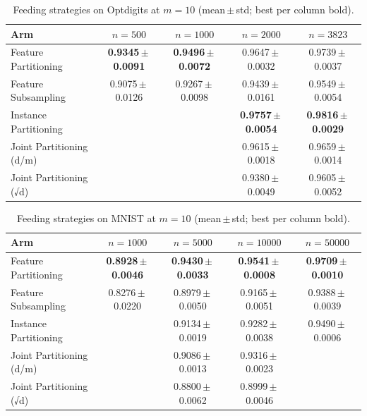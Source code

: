 \begin{table}[ht]
\centering\small
\begin{tabular}{lcccc}
\toprule
Arm & $n{=}500$ & $n{=}1000$ & $n{=}2000$ & $n{=}3823$ \\
\midrule
Feature Partitioning & \textbf{0.9345\,$\pm$\,0.0091} & \textbf{0.9496\,$\pm$\,0.0072} & 0.9647\,$\pm$\,0.0032 & 0.9739\,$\pm$\,0.0037 \\
Feature Subsampling & 0.9075\,$\pm$\,0.0126 & 0.9267\,$\pm$\,0.0098 & 0.9439\,$\pm$\,0.0161 & 0.9549\,$\pm$\,0.0054 \\
Instance Partitioning &  &  & \textbf{0.9757\,$\pm$\,0.0054} & \textbf{0.9816\,$\pm$\,0.0029} \\
Joint Partitioning (d/m) &  &  & 0.9615\,$\pm$\,0.0018 & 0.9659\,$\pm$\,0.0014 \\
Joint Partitioning (√d) &  &  & 0.9380\,$\pm$\,0.0049 & 0.9605\,$\pm$\,0.0052 \\
\bottomrule
\end{tabular}
\caption{Feeding strategies on Optdigits at $m=10$ (mean\,$\pm$\,std; best per column bold).}
\label{tab:feed_optdigits}
\end{table}

\begin{table}[ht]
\centering\small
\begin{tabular}{lcccc}
\toprule
Arm & $n{=}1000$ & $n{=}5000$ & $n{=}10000$ & $n{=}50000$ \\
\midrule
Feature Partitioning & \textbf{0.8928\,$\pm$\,0.0046} & \textbf{0.9430\,$\pm$\,0.0033} & \textbf{0.9541\,$\pm$\,0.0008} & \textbf{0.9709\,$\pm$\,0.0010} \\
Feature Subsampling & 0.8276\,$\pm$\,0.0220 & 0.8979\,$\pm$\,0.0050 & 0.9165\,$\pm$\,0.0051 & 0.9388\,$\pm$\,0.0039 \\
Instance Partitioning &  & 0.9134\,$\pm$\,0.0019 & 0.9282\,$\pm$\,0.0038 & 0.9490\,$\pm$\,0.0006 \\
Joint Partitioning (d/m) &  & 0.9086\,$\pm$\,0.0013 & 0.9316\,$\pm$\,0.0023 &  \\
Joint Partitioning (√d) &  & 0.8800\,$\pm$\,0.0062 & 0.8999\,$\pm$\,0.0046 &  \\
\bottomrule
\end{tabular}
\caption{Feeding strategies on MNIST at $m=10$ (mean\,$\pm$\,std; best per column bold).}
\label{tab:feed_mnist}
\end{table}

